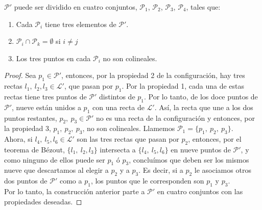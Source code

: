 \begin{Lema}
\label{Lema:Conf}
$\mathcal{P'}$ puede ser dividido en cuatro conjuntos, $\mathcal{P}_{1}$, $\mathcal{P}_{2}$, $\mathcal{P}_{3}$, $\mathcal{P}_{4}$, tales que:

\begin{enumerate}

\item Cada $\mathcal{P}_{i}$ tiene tres elementos de $\mathcal{P'}$.
\item $\mathcal{P}_{i} \cap \mathcal{P}_{k} = \emptyset$ si $i \neq j$
\item Los tres puntos en cada $\mathcal{P}_{i}$ no son colineales.

\end{enumerate}

\end{Lema}

\begin{proof}

  Sea $p_{1} \in \mathcal{P'}$, entonces, por la propiedad 2 de la configuración, hay tres rectas $\mathit{l}_{1},\ \mathit{l}_{2}, \mathit{l}_{3} \in \mathcal{L'}$, que pasan por $p_{1}$. Por la propiedad 1, cada una de estas rectas tiene tres puntos de $\mathcal{P'}$ distintos de $p_{1}$. Por lo tanto, de los doce puntos de $\mathcal{P'}$, nueve están unidos a $p_{1}$ con una recta de $\mathcal{L'}$. Así, la recta que une a los dos puntos restantes, $p_{2},\ p_{3} \in \mathcal{P'}$ no es una recta de la configuración y entonces, por la propiedad 3, $p_{1},\ p_{2},\ p_{3}$, no son colineales. Llamemos $\mathcal{P}_{1} = \{p_{1},\ p_{2},\ p_{3} \}$.
\\

Ahora, si $\mathit{l}_{4},\ \mathit{l}_{5}, \mathit{l}_{6} \in \mathcal{L'}$ son las tres rectas que pasan por $p_{2}$, entonces, por el teorema de Bézout, $\{ \mathit{l}_{1},\ \mathit{l}_{2}, \mathit{l}_{3} \}$ intersecta a  $\{ \mathit{l}_{4},\ \mathit{l}_{5}, \mathit{l}_{6} \}$ en nueve puntos de $\mathcal{P'}$, y como ninguno de ellos puede ser $p_{1}$ ó $p_{3}$, concluímos que deben ser los mismos nueve que descartamos al elegir a $p_{2}$ y a $p_{3}$. Es decir, si a $p_{2}$ le asociamos otros dos puntos de $\mathcal{P'}$ como a $p_{1}$, los puntos que le corresponden son $p_{1}$ y $p_{3}$.
\\

Por lo tanto, la construcción anterior parte a $\mathcal{P'}$ en cuatro conjuntos con las propiedades deseadas.

\end{proof}

